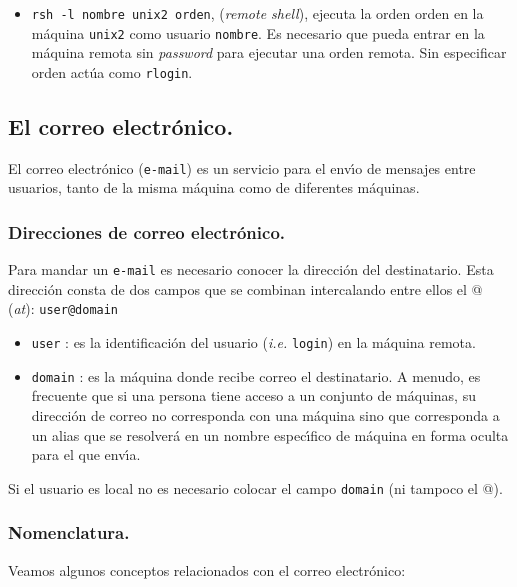 \begin{itemize}
\item \verb+rsh -l nombre unix2 orden+, ({\it remote shell}), ejecuta
  la orden orden en la m{\'a}quina \verb+unix2+ como usuario
  \verb+nombre+. Es necesario que pueda entrar en la m{\'a}quina remota
  sin {\it password} para ejecutar una orden remota. Sin especificar orden
  act{\'u}a como \verb+rlogin+.
\end{itemize}

\subsection{El correo electr{\'o}nico.} 

El correo electr{\'o}nico (\verb+e-mail+) es un servicio para el env{\'\i}o de
mensajes entre usuarios, tanto de la misma m{\'a}quina como de diferentes
m{\'a}quinas. 

\subsubsection{Direcciones de correo electr{\'o}nico.} 

Para mandar un \verb+e-mail+ es necesario conocer la direcci{\'o}n del
destinatario. Esta direcci{\'o}n consta de dos campos que se combinan
intercalando entre ellos el @ ({\it at}): \verb+user@domain+

\begin{itemize}
\item \verb+user+ : es la identificaci{\'o}n del usuario ({\it i.e.}
  \verb+login+) en la m{\'a}quina remota. 
  
\item \verb+domain+ : es la m{\'a}quina donde recibe correo el
  destinatario. A menudo, es frecuente que si una persona tiene acceso
  a un conjunto de m{\'a}quinas, su direcci{\'o}n de correo no corresponda con
  una m{\'a}quina sino que corresponda a un alias que se resolver{\'a} en un
  nombre espec{\'\i}fico de m{\'a}quina en forma oculta para el que env{\'\i}a.
\end{itemize}

Si el usuario es local no es necesario colocar el campo \verb+domain+
(ni tampoco el @).

\subsubsection{Nomenclatura.}

Veamos algunos conceptos relacionados con el correo electr{\'o}nico:

